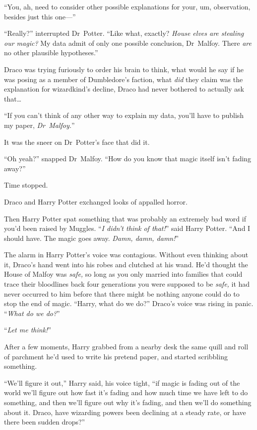 “You, ah, need to consider other possible explanations for your, um, observation, besides just this one—”

“Really?” interrupted Dr~Potter. “Like what, exactly? \emph{House elves are stealing our magic?} My data admit of only one possible conclusion, Dr~Malfoy. There \emph{are} no other plausible hypotheses.”

Draco was trying furiously to order his brain to think, what would he say if he was posing as a member of Dumbledore’s faction, what \emph{did} they claim was the explanation for wizardkind’s decline, Draco had never bothered to actually ask that…

“If you can’t think of any other way to explain my data, you’ll have to publish my paper, \emph{Dr~Malfoy.}”

It was the sneer on Dr~Potter’s face that did it.

“Oh yeah?” snapped Dr~Malfoy. “How do you know that magic itself isn’t fading away?”

Time stopped.

Draco and Harry Potter exchanged looks of appalled horror.

Then Harry Potter spat something that was probably an extremely bad word if you’d been raised by Muggles. “\emph{I didn’t think of that!}” said Harry Potter. “And I should have. The magic goes away. \emph{Damn, damn, damn!}”

The alarm in Harry Potter’s voice was contagious. Without even thinking about it, Draco’s hand went into his robes and clutched at his wand. He’d thought the House of Malfoy was \emph{safe,} so long as you only married into families that could trace their bloodlines back four generations you were supposed to be \emph{safe,} it had never occurred to him before that there might be nothing anyone could do to stop the end of magic. “Harry, what do we do?” Draco’s voice was rising in panic. “\emph{What do we do?}”

“\emph{Let me think!}”

After a few moments, Harry grabbed from a nearby desk the same quill and roll of parchment he’d used to write his pretend paper, and started scribbling something.

“We’ll figure it out,” Harry said, his voice tight, “if magic is fading out of the world we’ll figure out how fast it’s fading and how much time we have left to do something, and then we’ll figure out why it’s fading, and then we’ll do something about it. Draco, have wizarding powers been declining at a steady rate, or have there been sudden drops?”

